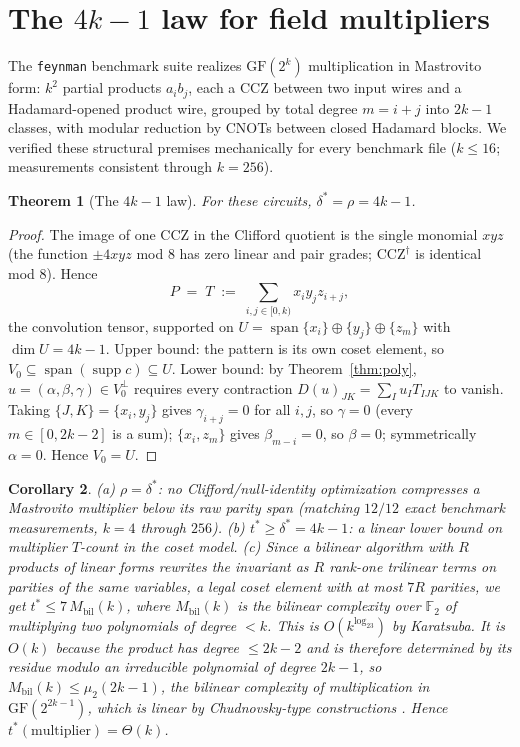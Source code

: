 \documentclass[11pt]{article}
\newtheorem{theorem}{Theorem}
\newtheorem{corollary}[theorem]{Corollary}
\theoremstyle{definition}
\theoremstyle{remark}
\newcommand{\F}{\mathbb{F}_2}
\newcommand{\spn}{\operatorname{span}}
\newcommand{\supp}{\operatorname{supp}}
\newcommand{\ds}{\delta^{*}}
\newcommand{\ts}{t^{*}}
\newcommand{\Mbil}{M_{\mathrm{bil}}}
\newcommand{\code}[1]{\texttt{#1}}
\begin{document}
\section{The $4k-1$ law for field multipliers}\label{sec:gf}

The \code{feynman} benchmark suite realizes $\mathrm{GF}(2^k)$ multiplication in Mastrovito form: $k^2$ partial
products $a_ib_j$, each a CCZ between two input wires and a Hadamard-opened product wire,
grouped by total degree $m=i+j$ into $2k-1$ classes, with modular reduction by CNOTs
between closed Hadamard blocks. We verified these structural premises mechanically for every
benchmark file ($k\le16$; measurements consistent through $k=256$).

\begin{theorem}[The $4k-1$ law]\label{thm:gf}
For these circuits, $\ds=\rho=4k-1$.
\end{theorem}
\begin{proof}
The image of one CCZ in the Clifford quotient is the single monomial $xyz$ (the function
$\pm4xyz$ mod $8$ has zero linear and pair grades; $\mathrm{CCZ}^{\dagger}$ is identical mod $8$). Hence
\[
  P\;=\;T\;:=\;\sum_{i,j\in[0,k)}x_iy_jz_{i+j},
\]
the convolution tensor, supported on $U=\spn\{x_i\}\oplus\{y_j\}\oplus\{z_m\}$ with $\dim U=4k-1$. Upper
bound: the pattern is its own coset element, so $V_0\subseteq\spn(\supp c)\subseteq U$. Lower bound: by
Theorem~\ref{thm:poly}, $u=(\alpha,\beta,\gamma)\in V_0^{\perp}$ requires every contraction $D(u)_{JK}=\sum_Iu_IT_{IJK}$ to vanish.
Taking $\{J,K\}=\{x_i,y_j\}$ gives $\gamma_{i+j}=0$ for all $i,j$, so $\gamma=0$ (every $m\in[0,2k-2]$ is a sum);
$\{x_i,z_m\}$ gives $\beta_{m-i}=0$, so $\beta=0$; symmetrically $\alpha=0$. Hence $V_0=U$.
\end{proof}

\begin{corollary}\label{cor:gf}
\textup{(a)} $\rho=\ds$: no Clifford/null-identity optimization compresses a Mastrovito
multiplier below its raw parity span (matching $12/12$ exact benchmark measurements, $k=4$
through $256$). \textup{(b)} $\ts\ge\ds=4k-1$: a linear lower bound on multiplier $T$-count in the coset
model. \textup{(c)} Since a bilinear algorithm with $R$ products of linear forms rewrites the invariant
as $R$ rank-one trilinear terms on parities of the same variables, a legal coset element with at most $7R$
parities, we get $\ts\le7\,\Mbil(k)$, where $\Mbil(k)$ is the bilinear complexity over $\F$ of multiplying two
polynomials of degree $<k$. This is $O(k^{\log_23})$ by Karatsuba. It is $O(k)$ because the product has
degree $\le2k-2$ and is therefore determined by its residue modulo an irreducible polynomial of degree $2k-1$, so
$\Mbil(k)\le\mu_2(2k-1)$, the bilinear complexity of multiplication in $\mathrm{GF}(2^{2k-1})$, which is linear by
Chudnovsky-type constructions \cite{KGP26b,CC88}. Hence $\ts(\text{multiplier})=\Theta(k)$.
\end{corollary}
\end{document}
